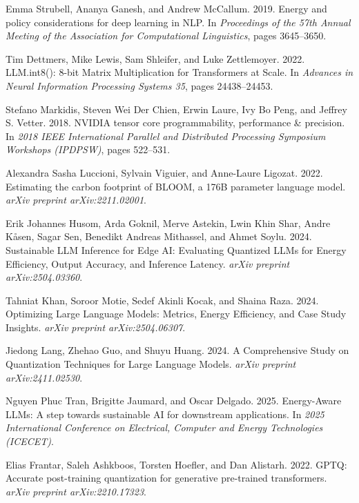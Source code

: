 \documentclass[sigconf,review]{acmart}
\begin{document}
\begin{thebibliography}{9}

Emma Strubell, Ananya Ganesh, and Andrew McCallum. 2019. Energy and policy considerations for deep learning in NLP. In \textit{Proceedings of the 57th Annual Meeting of the Association for Computational Linguistics}, pages 3645--3650.

Tim Dettmers, Mike Lewis, Sam Shleifer, and Luke Zettlemoyer. 2022. LLM.int8(): 8-bit Matrix Multiplication for Transformers at Scale. In \textit{Advances in Neural Information Processing Systems 35}, pages 24438--24453.

Stefano Markidis, Steven Wei Der Chien, Erwin Laure, Ivy Bo Peng, and Jeffrey S. Vetter. 2018. NVIDIA tensor core programmability, performance \& precision. In \textit{2018 IEEE International Parallel and Distributed Processing Symposium Workshops (IPDPSW)}, pages 522--531.

Alexandra Sasha Luccioni, Sylvain Viguier, and Anne-Laure Ligozat. 2022. Estimating the carbon footprint of BLOOM, a 176B parameter language model. \textit{arXiv preprint arXiv:2211.02001}.

Erik Johannes Husom, Arda Goknil, Merve Astekin, Lwin Khin Shar, Andre Kåsen, Sagar Sen, Benedikt Andreas Mithassel, and Ahmet Soylu. 2024. Sustainable LLM Inference for Edge AI: Evaluating Quantized LLMs for Energy Efficiency, Output Accuracy, and Inference Latency. \textit{arXiv preprint arXiv:2504.03360}.

Tahniat Khan, Soroor Motie, Sedef Akinli Kocak, and Shaina Raza. 2024. Optimizing Large Language Models: Metrics, Energy Efficiency, and Case Study Insights. \textit{arXiv preprint arXiv:2504.06307}.

Jiedong Lang, Zhehao Guo, and Shuyu Huang. 2024. A Comprehensive Study on Quantization Techniques for Large Language Models. \textit{arXiv preprint arXiv:2411.02530}.

Nguyen Phuc Tran, Brigitte Jaumard, and Oscar Delgado. 2025. Energy-Aware LLMs: A step towards sustainable AI for downstream applications. In \textit{2025 International Conference on Electrical, Computer and Energy Technologies (ICECET)}.

Elias Frantar, Saleh Ashkboos, Torsten Hoefler, and Dan Alistarh. 2022. GPTQ: Accurate post-training quantization for generative pre-trained transformers. \textit{arXiv preprint arXiv:2210.17323}.


\end{thebibliography}
\end{document}
